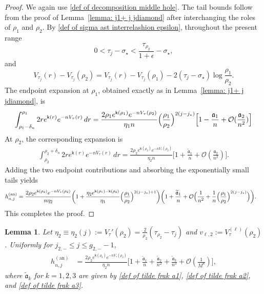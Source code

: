 \documentclass[a4paper]{article}
\newtheorem{lemma}[theorem]{Lemma}
\numberwithin{equation}{section}
\begin{document}
\begin{proof}
We again use \eqref{def of decomposition middle hole}. The tail bounds follow from the proof of Lemma~\ref{lemma: j1+ j jdiamond} after interchanging the roles of $\rho_1$ and $\rho_2$. By \eqref{def of sigma ast interrelashion epsilon}, throughout the present range
\[
0<\tau_j-\sigma_{\star}< \frac{\tau_{\rho_2}}{1+\epsilon}-\sigma_{\star}, 
\]
and 
\[
V_{\tau_j}(r)-V_{\tau_j}(\rho_{2})=
V_{\tau_j}(r)-V_{\tau_j}(\rho_{1})-2(\tau_j-\sigma_{\star})\log\frac{\rho_{1}}{\rho_{2}}. 
\]
The endpoint expansion at $\rho_1$, obtained exactly as in Lemma~\ref{lemma: j1+ j jdiamond}, is
\begin{align*}
\int_{\rho_1-\delta_n}^{\rho_1}2re^{\mathsf{k}(r)}e^{-nV_{\tau}(r)}\,dr 
=
\frac{2\rho_1e^{\mathsf{k}(\rho_1)}e^{-nV_{\tau}(\rho_2)}}{\eta_1n}
\Bigl(\frac{\rho_1}{\rho_2}\Bigr)^{2(j-j_{\star})}
\Bigl[1-\frac{\mathfrak{a}_1}{n}+\mathcal{O}(\frac{\mathfrak{a}_2}{n^2})\Bigr]
\end{align*}
At $\rho_2$, the corresponding expansion is
\begin{align*}
\int_{\rho_2}^{\rho_2+\delta_n}2re^{\mathsf{k}(r)}e^{-nV_{\tau}(r)}\,dr   
=
\frac{2\rho_2e^{\mathsf{k}(\rho_2)}e^{-nV_{\tau}(\rho_2)}}{\eta_2 n}\bigg[1+\frac{\widetilde{\mathfrak{a}}_1}{n}+\mathcal{O}(\frac{\mathfrak{a}_2}{n^2})\bigg]. 
\end{align*}
Adding the two endpoint contributions and absorbing the exponentially small tails yields
\begin{align*}
h_{n,j}^{(\mathrm{an})}
&=
\frac{2\rho_2e^{\mathsf{k}(\rho_2)}e^{-nV_{\tau}(\rho_2)}}{n\eta_2}
\bigg(
1+\frac{\eta_2e^{\mathsf{k}(\rho_1)-\mathsf{k}(\rho_2)}}{\eta_1}\Bigl( \frac{\rho_1}{\rho_2}\Bigr)^{2(j-j_{\star})+1}
\bigg)
\bigg(
1+\frac{\widetilde{\mathfrak{a}}_1}{n}+\mathcal{O}\Bigl(\frac{1}{n^2}+\frac{1}{n}\Bigl( \frac{\rho_1}{\rho_2}\Bigr)^{2(j-j_{\star})}\Bigr)
\bigg).
\end{align*}
This completes the proof. 

\end{proof}


\begin{lemma}\label{lemma:j2- j g2--1}
Let $\eta_2\equiv\eta_2(j):=V_{\tau}'(\rho_2)=\frac{2}{\rho_2}(\tau_{\rho_2}-\tau_j)$ and $v_{\ell,2}:=V_{\tau}^{(\ell)}(\rho_2)$. Uniformly for $j_{2,-}\leq j\leq g_{2,-}-1$,
\begin{align}
h_{n,j}^{(\mathrm{an})}
    &=\frac{2\rho_2e^{\mathsf{k}(\rho_2)}e^{-nV_{\tau}(\rho_2)}}{\eta_2 n}
\bigg[1+\frac{\widetilde{\mathfrak{a}}_1}{n}+\frac{\widetilde{\mathfrak{a}}_2}{n^2}+\frac{\widetilde{\mathfrak{a}}_3}{n^3}+\mathcal{O}(\frac{1}{M^8})\bigg],
\end{align}
where $\widetilde{\mathfrak{a}}_k$ for $k=1,2,3$ are given by \eqref{def of tilde frak a1}, \eqref{def of tilde frak a2}, and \eqref{def of tilde frak a3}. 
\end{lemma}
\end{document}
